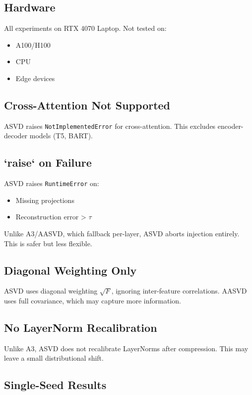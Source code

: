 \subsection{Hardware}

All experiments on RTX 4070 Laptop. Not tested on:
\begin{itemize}
\item A100/H100
\item CPU
\item Edge devices

\end{itemize}
\subsection{Cross-Attention Not Supported}

ASVD raises \texttt{NotImplementedError} for cross-attention. This excludes 
encoder-decoder models (T5, BART).

\subsection{`raise` on Failure}

ASVD raises \texttt{RuntimeError} on:
\begin{itemize}
\item Missing projections
\item Reconstruction error \textgreater{} $\tau$

\end{itemize}
Unlike A3/AASVD, which fallback per-layer, ASVD aborts injection entirely. 
This is safer but less flexible.

\subsection{Diagonal Weighting Only}

ASVD uses diagonal weighting $\sqrt{F}$, ignoring inter-feature 
correlations. AASVD uses full covariance, which may capture more 
information.

\subsection{No LayerNorm Recalibration}

Unlike A3, ASVD does not recalibrate LayerNorms after compression. This 
may leave a small distributional shift.

\subsection{Single-Seed Results}

